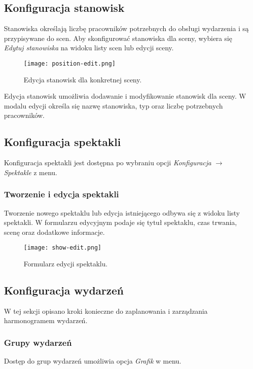 \documentclass[shortabstract]{iithesis}
\begin{document}
\subsection{Konfiguracja stanowisk}

Stanowiska określają liczbę pracowników potrzebnych do obsługi wydarzenia i są przypisywane do scen. Aby skonfigurować stanowiska dla sceny, wybiera się \textit{Edytuj stanowiska} na widoku listy scen lub edycji sceny.

\begin{figure}[H]
    \centering
    \texttt{[image: position-edit.png]}
    \caption{Edycja stanowisk dla konkretnej sceny.}
    \label{fig:position-edit}
\end{figure}

Edycja stanowisk umożliwia dodawanie i modyfikowanie stanowisk dla sceny. W modalu edycji określa się nazwę stanowiska, typ oraz liczbę potrzebnych pracowników.

\subsection{Konfiguracja spektakli}
\label{show-edit}

Konfiguracja spektakli jest dostępna po wybraniu opcji \textit{Konfiguracja} $\rightarrow$ \textit{Spektakle} z menu.

\subsubsection{Tworzenie i edycja spektakli}

Tworzenie nowego spektaklu lub edycja istniejącego odbywa się z widoku listy spektakli. W formularzu edycyjnym podaje się tytuł spektaklu, czas trwania, scenę oraz dodatkowe informacje.

\begin{figure}[H]
    \centering
    \texttt{[image: show-edit.png]}
    \caption{Formularz edycji spektaklu.}
    \label{fig:show-edit}
\end{figure}

\subsection{Konfiguracja wydarzeń}

W tej sekcji opisano kroki konieczne do zaplanowania i zarządzania harmonogramem wydarzeń.

\subsubsection{Grupy wydarzeń}
Dostęp do grup wydarzeń umożliwia opcja \textit{Grafik} w menu.
\end{document}
